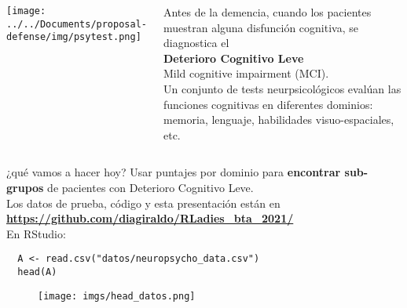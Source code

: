 \documentclass[10pt, aspectratio=169]{beamer}
\newcommand{\hltext}[2]{\colorbox{#1}{\textcolor{white}{\textbf{#2}}}}
\begin{document}
\begin{frame}[fragile]{}
\begin{overlayarea}{\textwidth}{9cm}
\vspace{0.5cm}
\begin{columns}
  \vspace{0.1cm}
  \texttt{[image: ../../Documents/proposal-defense/img/psytest.png]}
 \begin{center}
  Antes de la demencia, cuando los pacientes muestran alguna disfunción cognitiva, se diagnostica el\\ 
 \vspace{0.3cm}
 \textcolor{BlueMoon}{\textbf{\Large Deterioro Cognitivo Leve}}\\
 Mild cognitive impairment (MCI).\\
 \vspace{0.3cm}
 Un conjunto de tests neurpsicológicos evalúan las funciones cognitivas en diferentes dominios: memoria, lenguaje, habilidades visuo-espaciales, etc.
 \end{center}
\end{columns}
\end{overlayarea}
\end{frame}

\begin{frame}[fragile]{¿qué vamos a hacer hoy?}
 Usar puntajes por dominio para \textbf{encontrar sub-grupos} de pacientes con Deterioro Cognitivo Leve.\\
 \vspace{0.2cm}
 Los datos de prueba, código y esta presentación están en\\ \hltext{PinkPeacock}{\url{https://github.com/diagiraldo/RLadies_bta_2021/}}\\
 \vspace{0.4cm}
 \pause
 En RStudio:\\
 \vspace{-0.2cm}
 \begin{verbatim}
  A <- read.csv("datos/neuropsycho_data.csv")
  head(A)
 \end{verbatim}
 \vspace{-0.6cm}
 \begin{figure}
  \texttt{[image: imgs/head\_datos.png]}
 \end{figure}
\end{frame}
\end{document}
